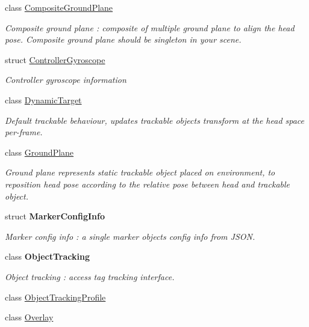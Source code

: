 \begin{DoxyCompactItemize}
class \mbox{\hyperlink{class_ximmerse_1_1_rhino_x_1_1_composite_ground_plane}{Composite\+Ground\+Plane}}
\begin{DoxyCompactList}\small\item\em Composite ground plane \+: composite of multiple ground plane to align the head pose. Composite ground plane should be singleton in your scene. \end{DoxyCompactList}\item 
struct \mbox{\hyperlink{struct_ximmerse_1_1_rhino_x_1_1_controller_gyroscope}{Controller\+Gyroscope}}
\begin{DoxyCompactList}\small\item\em Controller gyroscope information \end{DoxyCompactList}\item 
class \mbox{\hyperlink{class_ximmerse_1_1_rhino_x_1_1_dynamic_target}{Dynamic\+Target}}
\begin{DoxyCompactList}\small\item\em Default trackable behaviour, updates trackable object\textquotesingle{}s transform at the head space per-\/frame. \end{DoxyCompactList}\item 
class \mbox{\hyperlink{class_ximmerse_1_1_rhino_x_1_1_ground_plane}{Ground\+Plane}}
\begin{DoxyCompactList}\small\item\em Ground plane represents static trackable object placed on environment, to reposition head pose according to the relative pose between head and trackable object. \end{DoxyCompactList}\item 
struct {\bfseries Marker\+Config\+Info}
\begin{DoxyCompactList}\small\item\em Marker config info \+: a single marker object\textquotesingle{}s config info from J\+S\+ON. \end{DoxyCompactList}\item 
class {\bfseries Object\+Tracking}
\begin{DoxyCompactList}\small\item\em Object tracking \+: access tag tracking interface. \end{DoxyCompactList}\item 
class \mbox{\hyperlink{class_ximmerse_1_1_rhino_x_1_1_object_tracking_profile}{Object\+Tracking\+Profile}}
\item 
class \mbox{\hyperlink{class_ximmerse_1_1_rhino_x_1_1_overlay}{Overlay}}

\end{DoxyCompactItemize}
